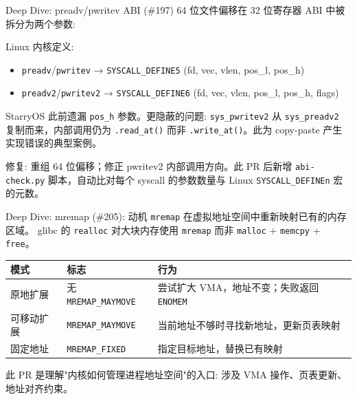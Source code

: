 \documentclass[aspectratio=169,10pt]{ctexbeamer}
\newcommand{\syscall}[1]{\texttt{#1}}
\newcommand{\code}[1]{\texttt{#1}}
\newcommand{\highlight}[1]{\textcolor{accent}{#1}}
\begin{document}
\begin{frame}[fragile,shrink=5]{Deep Dive: preadv/pwritev ABI (\#197)}
64 位文件偏移在 32 位寄存器 ABI 中被拆分为两个参数:

\begin{center}
\end{center}

Linux 内核定义:
\begin{itemize}
  \item \syscall{preadv}/\syscall{pwritev} → \texttt{SYSCALL\_DEFINE5} (fd, vec, vlen, pos\_l, pos\_h)
  \item \syscall{preadv2}/\syscall{pwritev2} → \texttt{SYSCALL\_DEFINE6} (fd, vec, vlen, pos\_l, pos\_h, flags)
\end{itemize}

\vspace{1mm}
StarryOS 此前遗漏 \texttt{pos\_h} 参数。更隐蔽的问题:
\syscall{sys\_pwritev2} 从 \syscall{sys\_preadv2} 复制而来，内部调用仍为 \code{.read\_at()}
而非 \code{.write\_at()}。此为 \highlight{copy-paste 产生实现错误的典型案例}。

\vspace{1mm}
修复: 重组 64 位偏移；修正 pwritev2 内部调用方向。此 PR 后新增 \texttt{abi-check.py}
脚本，自动比对每个 syscall 的参数数量与 Linux \texttt{SYSCALL\_DEFINEn} 宏的元数。
\end{frame}


\begin{frame}[shrink=10]{Deep Dive: mremap (\#205): 动机}
\syscall{mremap} 在虚拟地址空间中重新映射已有的内存区域。
glibc 的 \syscall{realloc} 对大块内存使用 \syscall{mremap} 而非 \syscall{malloc} + \syscall{memcpy} + \syscall{free}。

\vspace{1mm}
\begin{tabularx}{\textwidth}{p{2cm} p{3.5cm} X}
\toprule
\textbf{模式} & \textbf{标志} & \textbf{行为} \\
\midrule
原地扩展
  & 无 \texttt{MREMAP\_MAYMOVE}
  & 尝试扩大 VMA，地址不变；失败返回 \texttt{ENOMEM} \\
\midrule
可移动扩展
  & \texttt{MREMAP\_MAYMOVE}
  & 当前地址不够时寻找新地址，更新页表映射 \\
\midrule
固定地址
  & \texttt{MREMAP\_FIXED}
  & 指定目标地址，替换已有映射 \\
\bottomrule
\end{tabularx}

\vspace{1mm}
此 PR 是理解"内核如何管理进程地址空间"的入口: 涉及 VMA 操作、页表更新、地址对齐约束。
\end{frame}
\end{document}

